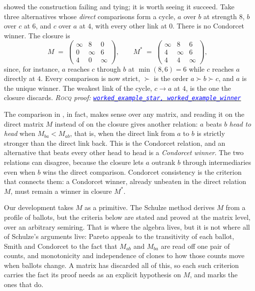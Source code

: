 \documentclass[a4paper,UKenglish,cleveref,autoref,thm-restate,anonymous]{lipics-v2021}
\newcommand{\Mstar}{M^{\ast}}
\newcommand{\rocq}{\textsc{Rocq}}
\newcommand{\anonrepo}{https://anonymous.4open.science/r/Semiring_graph_algorithm-000E}
\newcommand{\rocqfile}[2]{\href{\anonrepo/#1}{\textcolor{blue}{\texttt{#2}}}}
\newcommand{\proofat}[2]{{\footnotesize\itshape\rocq{} proof: \rocqfile{#1}{#2}}}
\begin{document}
\begin{example}\label{ex:worked}
 showed the construction failing and tying; it is worth
seeing it succeed. Take three alternatives whose \emph{direct} comparisons
form a cycle, $a$ over $b$ at strength $8$, $b$ over $c$ at $6$, and $c$
over $a$ at $4$, with every other link at $0$. There is no Condorcet winner.
The closure is
\[
  M \;=\;
  \begin{pmatrix}
    \infty & 8 & 0 \\
    0 & \infty & 6 \\
    4 & 0 & \infty
  \end{pmatrix},
  \qquad
  \Mstar \;=\;
  \begin{pmatrix}
    \infty & 8 & 6 \\
    4 & \infty & 6 \\
    4 & 4 & \infty
  \end{pmatrix},
\]
since, for instance, $a$ reaches $c$ through $b$ at
$\min(8,6) = 6$ while $c$ reaches $a$ directly at $4$. Every comparison is
now strict, $\succ$ is the order $a \succ b \succ c$, and $a$ is the unique
winner. The weakest link of the cycle, $c \to a$ at $4$, is the one the
closure discards.
\proofat{examples/SharpnessWitness.v}{worked\_example\_star,
worked\_example\_winner}
\end{example}

The comparison in , in fact, makes sense over any matrix, and reading
it on the direct matrix $M$ instead of on the closure gives another 
relation: $a$ beats $b$ \emph{head to head} when $M_{ba} < M_{ab}$, that is,
when the direct link from $a$ to $b$ is strictly stronger than the direct
link back. This is the Condorcet relation, and an alternative that beats
every other head to head is a \emph{Condorcet winner}. The two relations
can disagree, because the closure lets $a$ outrank $b$ through
intermediaries even when $b$ wins the direct comparison. 
Condorcet consistency is the
criterion that connects them: a Condorcet winner, already unbeaten in the
direct relation $M$, must remain a winner in closure $\Mstar$.

Our development takes $M$ as a primitive. The Schulze method derives $M$
from a profile of ballots, but the criteria below are stated and proved at
the matrix level, over an arbitrary semiring. That is where the algebra
lives, but it is not where all of Schulze's arguments live: Pareto appeals
to the transitivity of each ballot, Smith and Condorcet to the fact that
$M_{ab}$ and $M_{ba}$ are read off one pair of counts, and monotonicity and
independence of clones to how those counts move when ballots change. A
matrix has discarded all of this, so each such criterion carries the fact
its proof needs as an explicit hypothesis on $M$, and
 marks the ones that do.
\end{document}
